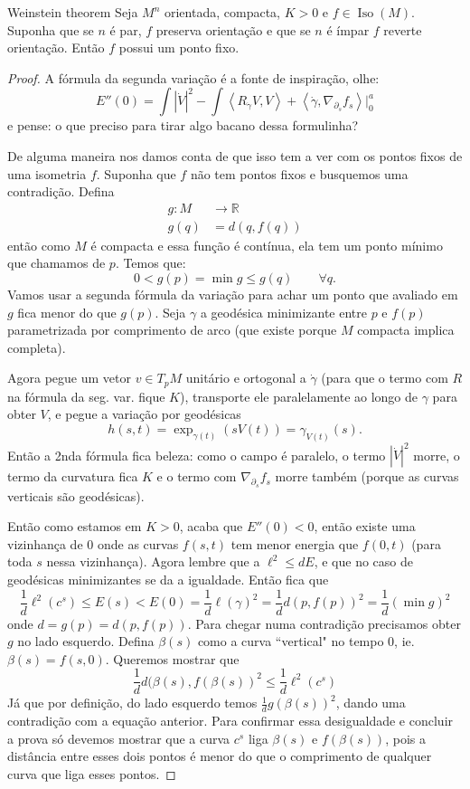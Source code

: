 \begin{thing6}{Weinstein theorem}\label{thm:Weinstein theorem}\leavevmode
Seja \(M^n\) orientada, compacta, \(K>0\) e \(f \in \operatorname{Iso}(M)\).  Suponha que se \(n\) é par, \(f\) preserva orientação e que se \(n\) é ímpar \(f\) reverte orientação. Então \(f\) possui um ponto fixo.
\end{thing6}

\begin{proof}\leavevmode
       A fórmula da segunda variação é a fonte de inspiração, olhe:
\[E''(0)=\int |\dot V|^2-\int\left<R_ {\dot \gamma}V,V\right>+\left<\dot\gamma,\nabla_{\partial_s}f_s\right>|_{0}^a\]
e pense: o que preciso para tirar algo bacano dessa formulinha?

	De alguma maneira nos damos conta de que isso tem a ver com os pontos fixos de uma isometria \(f\). Suponha que \(f\) não tem pontos fixos e busquemos uma contradição. Defina
 \begin{align*}
	g: M &\longrightarrow \mathbb{R} \\
	g(q) &=d(q,f(q))
\end{align*}
então como \(M\) é compacta e essa função é contínua, ela tem um ponto mínimo que chamamos de \(p\). Temos que:
 \[0<g(p)=\operatorname{min}g\leq g(q)\qquad \forall q.\]
Vamos usar a segunda fórmula da variação para achar um ponto que avaliado em \(g\) fica menor do que \(g(p)\). Seja \(\gamma\) a geodésica minimizante entre \(p\) e \(f(p)\) parametrizada por comprimento de arco (que existe porque \(M\) compacta implica completa).

Agora pegue um vetor \(v \in T_pM\) unitário e ortogonal a \(\dot \gamma\) (para que o termo com \(R\) na fórmula da seg. var. fique \(K\)), transporte ele paralelamente ao longo de \(\gamma\) para obter \(V\), e pegue a variação por geodésicas
\[h(s,t)=\operatorname{exp}_{\gamma(t)}(sV(t))=\gamma_{V(t)}(s).\]
Então a 2nda fórmula fica beleza: como o campo é paralelo, o termo \(|\dot V|^2\) morre, o termo da curvatura fica \(K\) e o termo com \(\nabla_{\partial_s}f_s\) morre também (porque as curvas verticais são geodésicas).

Então como estamos em \(K>0\), acaba que \(E''(0)<0\), então existe uma vizinhança de \(0\)  onde as curvas \(f(s,t)\) tem menor energia que \(f(0,t)\) (para toda \(s\) nessa  vizinhança). Agora lembre que a \(\ell^2 \leq dE\), e que no caso de geodésicas minimizantes se da a igualdade. Então fica que
\[\frac{1}{d}\ell^2(c^s)\leq E(s)<E(0)=\frac{1}{d}\ell(\gamma)^2=\frac{1}{d}d(p,f(p))^2=\frac{1}{d}(\operatorname{min}g)^2\]
onde \(d=g(p)=d(p,f(p))\). Para chegar numa contradição precisamos obter \(g\) no lado esquerdo. Defina \(\beta(s)\) como a curva ``vertical" no tempo 0, ie. \(\beta(s)=f(s,0)\). Queremos mostrar que
\[\boxed{\frac{1}{d}d(\beta(s),f(\beta(s))^2\leq \frac{1}{d}\ell^2(c^s)}\]
Já que por definição, do lado esquerdo temos \(\frac{1}{d}g(\beta(s))^2\), dando uma contradição com a equação anterior. Para confirmar essa desigualdade e concluir a prova só devemos mostrar que a curva \(c^s\) liga \(\beta(s)\) e \(f(\beta(s))\), pois a distância entre esses dois pontos é menor do que o comprimento de qualquer curva que liga esses pontos.


\end{proof}
